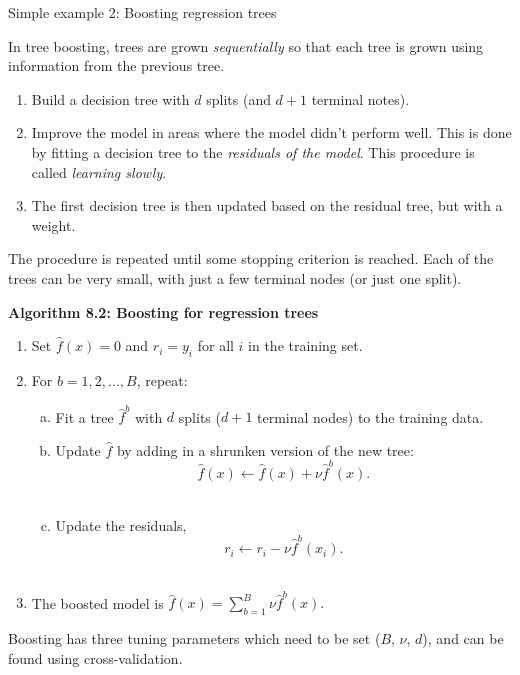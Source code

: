\documentclass[
  10pt,
  ignorenonframetext,
]{beamer}
\providecommand{\tightlist}{%
  \setlength{\itemsep}{0pt}\setlength{\parskip}{0pt}}
\begin{document}
\begin{frame}{Simple example 2: Boosting regression trees}
\protect\hypertarget{simple-example-2-boosting-regression-trees}{}
\(~\)

In tree boosting, trees are grown \emph{sequentially} so that each tree
is grown using information from the previous tree.

\vspace{2mm}

\begin{enumerate}
\tightlist
\item
  Build a decision tree with \(d\) splits (and \(d+1\) terminal notes).
\item
  Improve the model in areas where the model didn't perform well. This
  is done by fitting a decision tree to the \emph{residuals of the
  model}. This procedure is called \emph{learning slowly}.
\item
  The first decision tree is then updated based on the residual tree,
  but with a weight.
\end{enumerate}

The procedure is repeated until some stopping criterion is reached. Each
of the trees can be very small, with just a few terminal nodes (or just
one split).
\end{frame}

\begin{frame}
\textbf{Algorithm 8.2: Boosting for regression trees}

\begin{enumerate}
\tightlist
\item
  Set \(\hat{f}(x) = 0\) and \(r_i = y_i\) for all \(i\) in the training
  set.
\item
  For \(b=1,2,...,B\), repeat:

  \begin{enumerate}
  [a)]
  \tightlist
  \item
    Fit a tree \(\hat{f}^b\) with \(d\) splits (\(d+1\) terminal nodes)
    to the training data.\\
  \item
    Update \(\hat{f}\) by adding in a shrunken version of the new tree:
    \[\hat{f}(x) \leftarrow \hat{f}(x)+\nu \hat{f}^b(x).\]\\
  \item
    Update the residuals, \[r_i \leftarrow r_i - \nu \hat{f}^b(x_i).\]\\
  \end{enumerate}
\item
  The boosted model is \(\hat{f}(x) = \sum_{b=1}^B \nu \hat{f}^b(x).\)
\end{enumerate}

Boosting has three tuning parameters which need to be set (\(B\),
\(\nu\), \(d\)), and can be found using cross-validation.
\end{frame}
\end{document}

